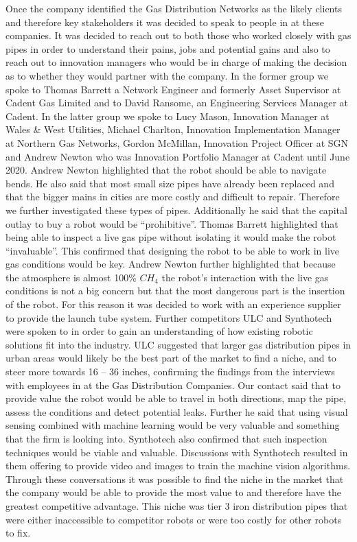 \documentclass[11pt]{article}		%
\begin{document}
	        Once the company identified the Gas Distribution Networks as the likely clients and therefore key stakeholders it was decided to speak to people in at these companies. It was decided to reach out to both those who worked closely with gas pipes in order to understand their pains, jobs and potential gains and also to reach out to innovation managers who would be in charge of making the decision as to whether they would partner with the company.
	        In the former group we spoke to Thomas Barrett a Network Engineer and formerly Asset Supervisor at Cadent Gas Limited and to David Ransome, an Engineering Services Manager at Cadent. In the latter group we spoke to Lucy Mason, Innovation Manager at Wales \& West Utilities, Michael Charlton, Innovation Implementation Manager at Northern Gas Networks, Gordon McMillan, Innovation Project Officer at SGN and Andrew Newton who was Innovation Portfolio Manager at Cadent until June 2020.
	        Andrew Newton highlighted that the robot should be able to navigate bends. He also said that most small size pipes have already been replaced and that the bigger mains in cities are more costly and difficult to repair. Therefore we further investigated these types of pipes. Additionally he said that the capital outlay to buy a robot would be “prohibitive”. 
	        Thomas Barrett highlighted that being able to inspect a live gas pipe without isolating it would make the robot “invaluable”. This confirmed that designing the robot to be able to work in live gas conditions would be key. Andrew Newton further highlighted that because the atmosphere is almost 100\% ${CH}_4$ the robot’s interaction with the live gas conditions is not a big concern but that the most dangerous part is the insertion of the robot. For this reason it was decided to work with an experience supplier to provide the launch tube system.
	        Further competitors ULC and Synthotech were spoken to in order to gain an understanding of how existing robotic solutions fit into the industry. ULC suggested that larger gas distribution pipes in urban areas would likely be the best part of the market to find a niche, and to steer more towards 16 – 36 inches, confirming the findings from the interviews with employees in at the Gas Distribution Companies. Our contact said that to provide value the robot would be able to travel in both directions, map the pipe, assess the conditions and detect potential leaks. Further he said that using visual sensing combined with machine learning would be very valuable and something that the firm is looking into. Synthotech also confirmed that such inspection techniques would be viable and valuable. Discussions with Synthotech resulted in them offering to provide video and images to train the machine vision algorithms.
	        Through these conversations it was possible to find the niche in the market that the company would be able to provide the most value to and therefore have the greatest competitive advantage. This niche was tier 3 iron distribution pipes that were either inaccessible to competitor robots or were too costly for other robots to fix.
        
\end{document}
